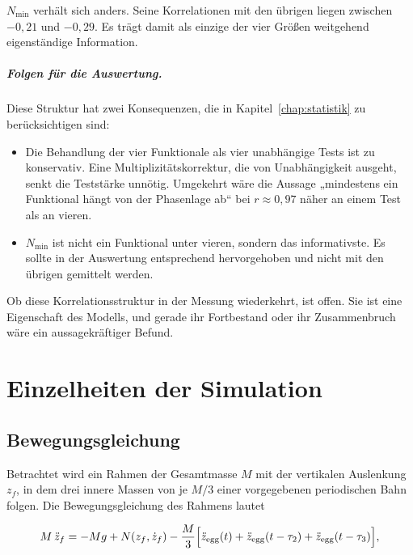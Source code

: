\documentclass[12pt,a4paper]{report}
\begin{document}
$N_{\min}$ verhält sich anders. Seine Korrelationen mit den übrigen
liegen zwischen $-0{,}21$ und $-0{,}29$. Es trägt damit als einzige der
vier Größen weitgehend eigenständige Information.

\paragraph{Folgen für die Auswertung.}
Diese Struktur hat zwei Konsequenzen, die in
Kapitel~\ref{chap:statistik} zu berücksichtigen sind:

\begin{itemize}
\item Die Behandlung der vier Funktionale als vier unabhängige Tests ist
      zu konservativ. Eine Multiplizitätskorrektur, die von
      Unabhängigkeit ausgeht, senkt die Teststärke unnötig. Umgekehrt
      wäre die Aussage „mindestens ein Funktional hängt von der
      Phasenlage ab“ bei $r \approx 0{,}97$ näher an einem Test als an
      vieren.
\item $N_{\min}$ ist nicht ein Funktional unter vieren, sondern das
      informativste. Es sollte in der Auswertung entsprechend
      hervorgehoben und nicht mit den übrigen gemittelt werden.
\end{itemize}

Ob diese Korrelationsstruktur in der Messung wiederkehrt, ist offen. Sie
ist eine Eigenschaft des Modells, und gerade ihr Fortbestand oder ihr
Zusammenbruch wäre ein aussagekräftiger Befund.


\chapter{Einzelheiten der Simulation}
\label{app:simulation}

\section{Bewegungsgleichung}

Betrachtet wird ein Rahmen der Gesamtmasse $M$ mit der vertikalen
Auslenkung $z_f$, in dem drei innere Massen von je $M/3$ einer
vorgegebenen periodischen Bahn folgen. Die Bewegungsgleichung des
Rahmens lautet

\begin{equation}
M\,\ddot{z}_f = -M g + N(z_f, \dot{z}_f)
- \frac{M}{3}\Bigl[\ddot{z}_{\mathrm{egg}}(t)
+ \ddot{z}_{\mathrm{egg}}(t-\tau_2)
+ \ddot{z}_{\mathrm{egg}}(t-\tau_3)\Bigr],
\label{eq:bewegung}
\end{equation}
\end{document}
